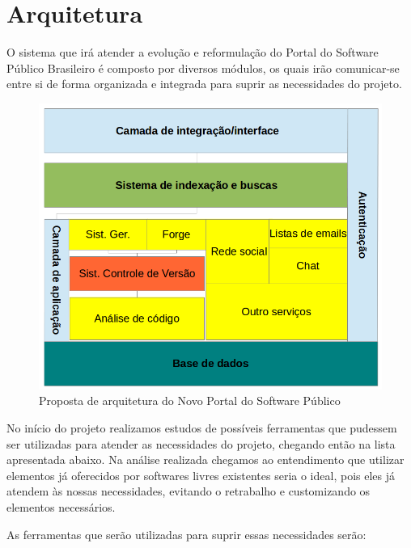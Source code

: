 \section{Arquitetura}
\label{sec:arquitetura}

O sistema que irá atender a evolução e reformulação do Portal do Software Público Brasileiro é composto por diversos módulos, os quais irão comunicar-se entre si de forma organizada e integrada para suprir as necessidades do projeto.
%

\begin{figure}[htpb]
  \begin{center}
    \includegraphics[width=.37\textwidth]{images/visao_arq.png}
  \end{center}
  \caption{Proposta de arquitetura do Novo Portal do Software Público}
  \label{fig:core_concurrent}
\end{figure}
No início do projeto realizamos estudos de possíveis ferramentas que pudessem ser utilizadas para atender as necessidades do projeto, chegando então na lista apresentada abaixo.
Na análise realizada chegamos ao entendimento que utilizar elementos já oferecidos por softwares livres existentes seria o ideal, pois eles já atendem às nossas necessidades, evitando o retrabalho e customizando os elementos necessários.   

As ferramentas que serão utilizadas para suprir essas necessidades serão:

